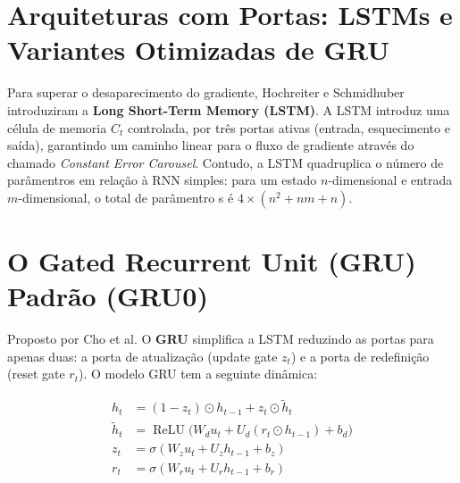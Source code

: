 \documentclass[11pt]{article}
\begin{document}
\section{Arquiteturas com Portas: LSTMs e Variantes Otimizadas de GRU}

Para superar o desaparecimento do gradiente, Hochreiter e Schmidhuber introduziram a \textbf{Long Short-Term Memory (LSTM)}. A LSTM introduz uma célula de memoria \(C_t\) controlada, por três portas ativas (entrada, esquecimento e saída), garantindo um caminho linear para o fluxo de gradiente através do chamado \emph{Constant Error Carousel}.
Contudo, a LSTM quadruplica o número de parâmentros em relação à RNN simples: para um estado \(n\)-dimensional e entrada \(m\)-dimensional, o total de parâmentro s é \(4  \times (n^2 + nm + n)\).

\section{O Gated Recurrent Unit (GRU) Padrão (GRU0)}

Proposto por Cho et al. O \textbf{GRU} simplifica a LSTM reduzindo as portas para apenas duas: a porta de atualização (update gate \(z_t\)) e a porta de redefinição (reset gate \(r_t\)). O modelo GRU tem a seguinte dinâmica:


\begin{equation}
\begin{aligned}
h_t &= (1-z_t)\odot h_{t-1} + z_t\odot\tilde{h}_t \\[6pt]
\tilde{h}_t &= \operatorname{ReLU}\bigl(W_d u_t + U_d(r_t\odot h_{t-1}) + b_d\bigr) \\[6pt]
z_t &= \sigma(W_z u_t + U_z h_{t-1} + b_z) \\[6pt]
r_t &= \sigma(W_r u_t + U_r h_{t-1} + b_r)
\end{aligned}
\end{equation}
\end{document}
